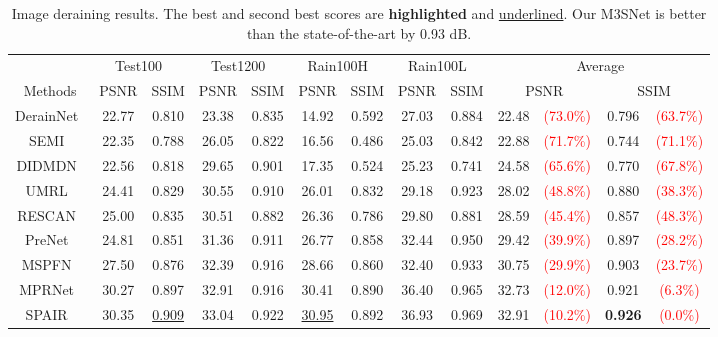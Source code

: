 \documentclass[sn-mathphys,Numbered]{sn-jnl}
\theoremstyle{thmstyleone}\newtheorem{theorem}{Theorem}\newtheorem{proposition}[theorem]{Proposition}
\theoremstyle{thmstyletwo}\newtheorem{example}{Example}\newtheorem{remark}{Remark}
\theoremstyle{thmstylethree}\newtheorem{definition}{Definition}
\begin{document}
\begin{sidewaystable}
\caption{Image deraining results. The best and second best scores are \textbf{highlighted} and \underline{underlined}. Our M3SNet is better than the state-of-the-art by 0.93 dB. }\label{tb:01}
\begin{tabular}{ccccccccc||cccc}
    \hline
    \multicolumn{1}{c}{} & \multicolumn{2}{c}{Test100~\cite{Test100}}  & \multicolumn{2}{c}{Test1200~\cite{MSPFN}} & \multicolumn{2}{c}{Rain100H~\cite{Rain100}} & \multicolumn{2}{c||}{Rain100L~\cite{Rain100}} & \multicolumn{4}{c}{Average} 
    \\
   Methods &PSNR  &  SSIM   & PSNR  & SSIM  &PSNR  &SSIM  & PSNR &SSIM  & \multicolumn{2}{c}{PSNR } & \multicolumn{2}{c}{SSIM }
    \\
    \hline\hline
    DerainNet~\cite{DerainNet}  & 22.77 & 0.810  & 23.38  & 0.835  & 14.92 &  0.592  & 27.03 & 0.884 & 22.48 & \textcolor{red}{(73.0\%)} & 0.796 & \textcolor{red}{(63.7\%)}
    \\
     SEMI~\cite{semi}  & 22.35  & 0.788  & 26.05 & 0.822  & 16.56 &  0.486 & 25.03 & 0.842 & 22.88 & \textcolor{red}{(71.7\%)} & 0.744 &\textcolor{red}{(71.1\%)}
     \\
    DIDMDN~\cite{DIDMDN} & 22.56 & 0.818  & 29.65 & 0.901  & 17.35 &  0.524 &25.23 & 0.741 & 24.58 & \textcolor{red}{(65.6\%)} & 0.770&\textcolor{red}{(67.8\%)}
     \\
    UMRL~\cite{UMRL}  & 24.41 &0.829 & 30.55 &  0.910   & 26.01 & 0.832 & 29.18 & 0.923& 28.02 & \textcolor{red}{(48.8\%)} & 0.880 & \textcolor{red}{(38.3\%)}
       \\
    RESCAN~\cite{RESCAN}  & 25.00 & 0.835 & 30.51 & 0.882  &26.36 & 0.786 & 29.80 &0.881 & 28.59 &\textcolor{red}{(45.4\%)} & 0.857&\textcolor{red}{(48.3\%)}
       \\
     PreNet~\cite{PREnet}  & 24.81 &0.851 & 31.36&  0.911   & 26.77 & 0.858  &32.44 & 0.950 &29.42 & \textcolor{red}{(39.9\%)} & 0.897 &\textcolor{red}{(28.2\%)}
    \\
   MSPFN~\cite{MSPFN}  & 27.50 & 0.876 & 32.39 &  0.916   & 28.66 & 0.860  & 32.40 & 0.933 & 30.75 &\textcolor{red}{(29.9\%)} & 0.903&\textcolor{red}{(23.7\%)}
       \\
     MPRNet~\cite{Zamir2021MPRNet}  & 30.27 & 0.897 & 32.91 &  0.916   & 30.41 & 0.890  & 36.40 & 0.965 & 32.73 &\textcolor{red}{(12.0\%)} & 0.921&\textcolor{red}{(6.3\%)}
       \\
     SPAIR~\cite{SPAIR}  & 30.35 & \underline{0.909} & 33.04 &  0.922   & \underline{30.95} & 0.892  & 36.93 & 0.969& 32.91 &\textcolor{red}{(10.2\%)}& \textbf{0.926}&\textcolor{red}{(0.0\%)}

\end{tabular}
\end{sidewaystable}
\end{document}
